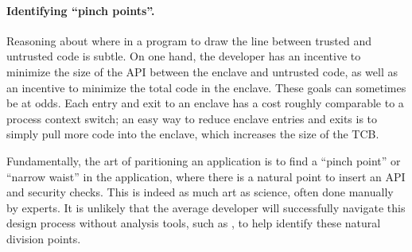 
\paragraph{Identifying ``pinch points''.}
Reasoning about where in a program to draw the line between 
trusted and untrusted code is subtle.
On one hand, the developer has an incentive to minimize the size of the 
API between the enclave and untrusted code, as well as an incentive to
minimize the total code in the enclave.  These goals can sometimes be at odds.
Each entry and exit to an enclave has a cost roughly comparable to a
process context switch; an easy way to reduce enclave entries and exits is to simply 
pull more code into the enclave, which increases the size of the TCB.


Fundamentally, the art of paritioning an application is to find a ``pinch point'' or
``narrow waist'' in the application, where there is a natural point to insert an API and 
security checks.  This is indeed as much art as science, often done manually by experts.
It is unlikely that the average developer will successfully navigate this design process without analysis tools, such as ,
to help identify these natural division points.



